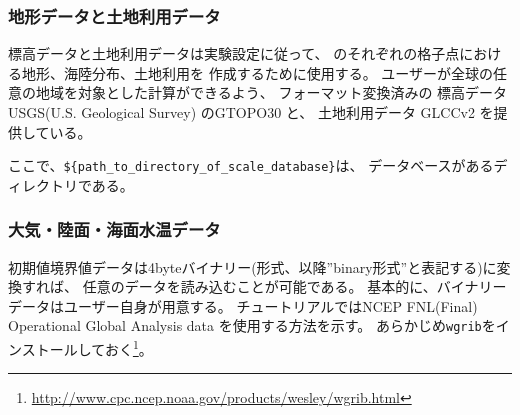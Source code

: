 \subsubsection{地形データと土地利用データ}
標高データと土地利用データは実験設定に従って、
\scalerm のそれぞれの格子点における地形、海陸分布、土地利用を
作成するために使用する。
ユーザーが全球の任意の地域を対象とした計算ができるよう、
フォーマット変換済みの
標高データ USGS(U.S. Geological Survey) のGTOPO30 と、
土地利用データ GLCCv2 を提供している。

ここで、\verb|${path_to_directory_of_scale_database}|は、
データベースがあるディレクトリである。

\subsubsection{大気・陸面・海面水温データ}
初期値境界値データは4byteバイナリー(\grads 形式、以降''binary形式''と表記する)に変換すれば、
任意のデータを読み込むことが可能である。
基本的に、バイナリーデータはユーザー自身が用意する。
チュートリアルではNCEP FNL(Final) Operational Global Analysis data を使用する方法を示す。
あらかじめ\verb|wgrib|をインストールしておく\footnote{\url{http://www.cpc.ncep.noaa.gov/products/wesley/wgrib.html}}。

